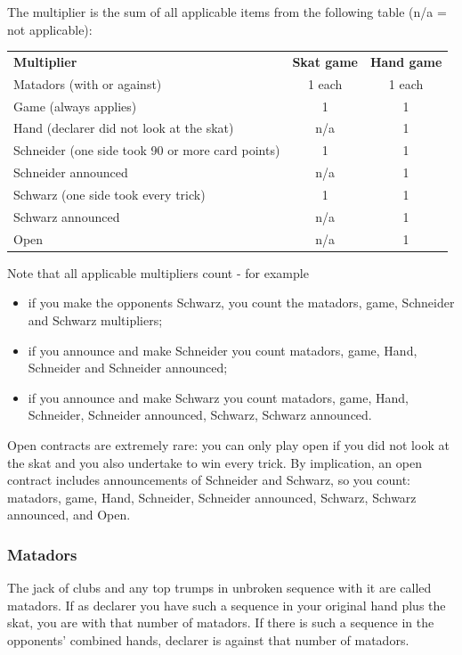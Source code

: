 \documentclass[letter]{article}
\begin{document}
  The multiplier is the sum of all applicable items from the following table
  (n/a = not applicable):

  \begin{tabular}{l c c}
    {\bfseries Multiplier} & {\bfseries Skat game} & {\bfseries Hand game} \\
    Matadors (with or against) & 1 each & 1 each \\
    Game (always applies) & 1 & 1 \\
    Hand (declarer did not look at the skat) & n/a & 1 \\
    Schneider (one side took 90 or more card points) & 1 & 1 \\
    Schneider announced  & n/a & 1 \\
    Schwarz (one side took every trick) & 1 & 1 \\
    Schwarz announced  & n/a & 1 \\
    Open & n/a & 1 \\
  \end{tabular}

  Note that all applicable multipliers count - for example

  \begin{itemize}
    \item if you make the opponents Schwarz, you count the matadors, game,
      Schneider and Schwarz multipliers;
    \item if you announce and make Schneider you count matadors, game, Hand,
      Schneider and Schneider announced;
    \item if you announce and make Schwarz you count matadors, game, Hand,
      Schneider, Schneider announced, Schwarz, Schwarz announced.
  \end{itemize}

  Open contracts are extremely rare: you can only play open if you did not look
  at the skat and you also undertake to win every trick. By implication, an open
  contract includes announcements of Schneider and Schwarz, so you count:
  matadors, game, Hand, Schneider, Schneider announced, Schwarz, Schwarz
  announced, and Open.

  \subsubsection*{Matadors}

  The jack of clubs and any top trumps in unbroken sequence with it are called
  matadors. If as declarer you have such a sequence in your original hand plus
  the skat, you are with that number of matadors. If there is such a sequence in
  the opponents' combined hands, declarer is against that number of matadors.
\end{document}
